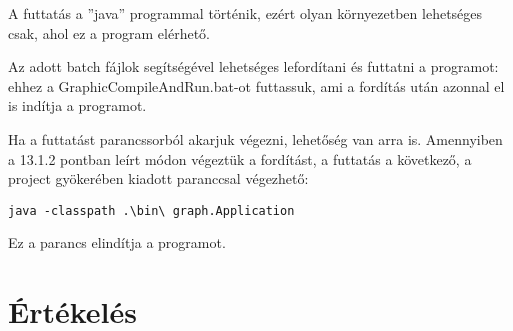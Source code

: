 A futtatás a ''java'' programmal történik, ezért olyan környezetben lehetséges csak, ahol ez a program elérhető. 

Az adott batch fájlok segítségével lehetséges lefordítani és futtatni a programot: ehhez a GraphicCompileAndRun.bat-ot futtassuk, ami a fordítás után azonnal el is indítja a programot.

Ha a futtatást parancssorból akarjuk végezni, lehetőség van arra is. Amennyiben a 13.1.2 pontban leírt módon végeztük a fordítást, a futtatás a következő, a project gyökerében kiadott paranccsal végezhető:

\begin{lstlisting}
java -classpath .\bin\ graph.Application
\end{lstlisting}
Ez a parancs elindítja a programot.

\section{Értékelés}


